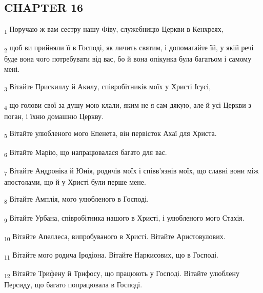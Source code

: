 \subsection{CHAPTER 16}
\begin{tcolorbox}
\textsubscript{1} Поручаю ж вам сестру нашу Фіву, служебницю Церкви в Кенхреях,
\end{tcolorbox}
\begin{tcolorbox}
\textsubscript{2} щоб ви прийняли її в Господі, як личить святим, і допомагайте їй, у якій речі буде вона чого потребувати від вас, бо й вона опікунка була багатьом і самому мені.
\end{tcolorbox}
\begin{tcolorbox}
\textsubscript{3} Вітайте Прискиллу й Акилу, співробітників моїх у Христі Ісусі,
\end{tcolorbox}
\begin{tcolorbox}
\textsubscript{4} що голови свої за душу мою клали, яким не я сам дякую, але й усі Церкви з поган, і їхню домашню Церкву.
\end{tcolorbox}
\begin{tcolorbox}
\textsubscript{5} Вітайте улюбленого мого Епенета, він первісток Ахаї для Христа.
\end{tcolorbox}
\begin{tcolorbox}
\textsubscript{6} Вітайте Марію, що напрацювалася багато для вас.
\end{tcolorbox}
\begin{tcolorbox}
\textsubscript{7} Вітайте Андроніка й Юнія, родичів моїх і співв'язнів моїх, що славні вони між апостолами, що й у Христі були перше мене.
\end{tcolorbox}
\begin{tcolorbox}
\textsubscript{8} Вітайте Амплія, мого улюбленого в Господі.
\end{tcolorbox}
\begin{tcolorbox}
\textsubscript{9} Вітайте Урбана, співробітника нашого в Христі, і улюбленого мого Стахія.
\end{tcolorbox}
\begin{tcolorbox}
\textsubscript{10} Вітайте Апеллеса, випробуваного в Христі. Вітайте Аристовулових.
\end{tcolorbox}
\begin{tcolorbox}
\textsubscript{11} Вітайте мого родича Іродіона. Вітайте Наркисових, що в Господі.
\end{tcolorbox}
\begin{tcolorbox}
\textsubscript{12} Вітайте Трифену й Трифосу, що працюють у Господі. Вітайте улюблену Персиду, що багато попрацювала в Господі.
\end{tcolorbox}
